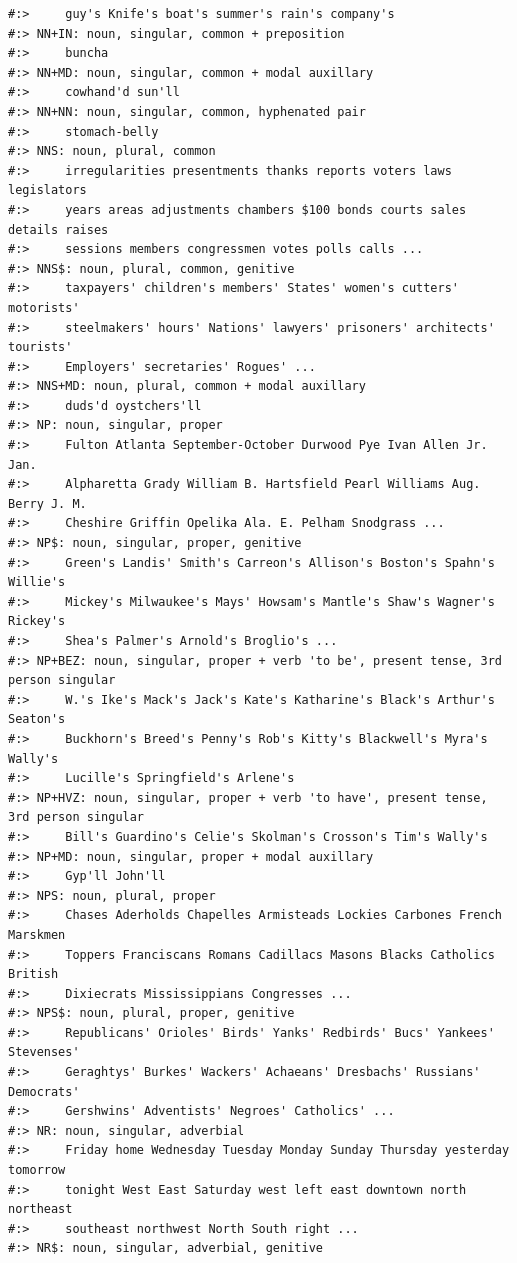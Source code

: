 \documentclass[
]{book}
\begin{document}
\begin{verbatim}
#:>     guy's Knife's boat's summer's rain's company's
#:> NN+IN: noun, singular, common + preposition
#:>     buncha
#:> NN+MD: noun, singular, common + modal auxillary
#:>     cowhand'd sun'll
#:> NN+NN: noun, singular, common, hyphenated pair
#:>     stomach-belly
#:> NNS: noun, plural, common
#:>     irregularities presentments thanks reports voters laws legislators
#:>     years areas adjustments chambers $100 bonds courts sales details raises
#:>     sessions members congressmen votes polls calls ...
#:> NNS$: noun, plural, common, genitive
#:>     taxpayers' children's members' States' women's cutters' motorists'
#:>     steelmakers' hours' Nations' lawyers' prisoners' architects' tourists'
#:>     Employers' secretaries' Rogues' ...
#:> NNS+MD: noun, plural, common + modal auxillary
#:>     duds'd oystchers'll
#:> NP: noun, singular, proper
#:>     Fulton Atlanta September-October Durwood Pye Ivan Allen Jr. Jan.
#:>     Alpharetta Grady William B. Hartsfield Pearl Williams Aug. Berry J. M.
#:>     Cheshire Griffin Opelika Ala. E. Pelham Snodgrass ...
#:> NP$: noun, singular, proper, genitive
#:>     Green's Landis' Smith's Carreon's Allison's Boston's Spahn's Willie's
#:>     Mickey's Milwaukee's Mays' Howsam's Mantle's Shaw's Wagner's Rickey's
#:>     Shea's Palmer's Arnold's Broglio's ...
#:> NP+BEZ: noun, singular, proper + verb 'to be', present tense, 3rd person singular
#:>     W.'s Ike's Mack's Jack's Kate's Katharine's Black's Arthur's Seaton's
#:>     Buckhorn's Breed's Penny's Rob's Kitty's Blackwell's Myra's Wally's
#:>     Lucille's Springfield's Arlene's
#:> NP+HVZ: noun, singular, proper + verb 'to have', present tense, 3rd person singular
#:>     Bill's Guardino's Celie's Skolman's Crosson's Tim's Wally's
#:> NP+MD: noun, singular, proper + modal auxillary
#:>     Gyp'll John'll
#:> NPS: noun, plural, proper
#:>     Chases Aderholds Chapelles Armisteads Lockies Carbones French Marskmen
#:>     Toppers Franciscans Romans Cadillacs Masons Blacks Catholics British
#:>     Dixiecrats Mississippians Congresses ...
#:> NPS$: noun, plural, proper, genitive
#:>     Republicans' Orioles' Birds' Yanks' Redbirds' Bucs' Yankees' Stevenses'
#:>     Geraghtys' Burkes' Wackers' Achaeans' Dresbachs' Russians' Democrats'
#:>     Gershwins' Adventists' Negroes' Catholics' ...
#:> NR: noun, singular, adverbial
#:>     Friday home Wednesday Tuesday Monday Sunday Thursday yesterday tomorrow
#:>     tonight West East Saturday west left east downtown north northeast
#:>     southeast northwest North South right ...
#:> NR$: noun, singular, adverbial, genitive

\end{verbatim}
\end{document}
